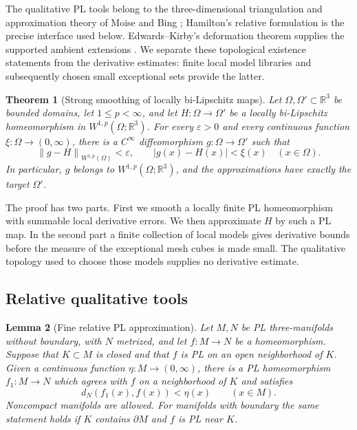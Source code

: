 \documentclass[11pt]{article}
\numberwithin{equation}{section}
\newtheorem{theorem}{Theorem}[section]
\newtheorem{lemma}[theorem]{Lemma}
\theoremstyle{definition}
\theoremstyle{remark}
\newcommand{\R}{\mathbb R}
\newcommand{\eps}{\varepsilon}
\newcommand{\norm}[1]{\left\lVert #1\right\rVert}
\begin{document}
The qualitative PL tools belong to the three-dimensional triangulation
and approximation theory of Moise and Bing
\cite{Moise1952Approximation,Moise1952Triangulation,Bing1959}; Hamilton's
relative formulation \cite{Hamilton1976} is the precise interface used
below. Edwards--Kirby's deformation theorem supplies the supported
ambient extensions \cite{EdwardsKirby1971}. We separate these
topological existence statements from the derivative estimates:
finite local model libraries and subsequently chosen small exceptional
sets provide the latter.

\begin{theorem}[Strong smoothing of locally bi-Lipschitz maps]
\label{sm:smoothing}
Let $\Omega,\Omega'\subset\R^3$ be bounded domains, let
$1\le p<\infty$, and let $H:\Omega\to\Omega'$ be a locally
bi-Lipschitz homeomorphism in $W^{1,p}(\Omega;\R^3)$.  For every
$\eps>0$ and every continuous function $\xi:\Omega\to(0,\infty)$,
there is a $C^\infty$ diffeomorphism $g:\Omega\to\Omega'$ such that
\begin{equation}
 \label{sm:smoothing-conclusion}
 \norm{g-H}_{W^{1,p}(\Omega)}<\eps,
 \qquad |g(x)-H(x)|<\xi(x)\quad(x\in\Omega).
\end{equation}
In particular, $g$ belongs to $W^{1,p}(\Omega;\R^3)$, and the
approximations have exactly the target $\Omega'$.
\end{theorem}

The proof has two parts.  First we smooth a locally finite PL
homeomorphism with summable local derivative errors.  We then approximate
$H$ by such a PL map.  In the second part a finite collection of local
models gives derivative bounds before the measure of the exceptional
mesh cubes is made small.  The qualitative topology used to choose those
models supplies no derivative estimate.

\subsection{Relative qualitative tools}

\begin{lemma}[Fine relative PL approximation]
\label{sm:relative-pl}
Let $M,N$ be PL three-manifolds without boundary, with $N$ metrized,
and let $f:M\to N$ be a homeomorphism.  Suppose that $K\subset M$ is
closed and that $f$ is PL on an open neighborhood of $K$.  Given a
continuous function $\eta:M\to(0,\infty)$, there is a PL
homeomorphism $f_1:M\to N$ which agrees with $f$ on a neighborhood of
$K$ and satisfies
\[
 d_N(f_1(x),f(x))<\eta(x)\qquad(x\in M).
\]
Noncompact manifolds are allowed.  For manifolds with boundary the same
statement holds if $K$ contains $\partial M$ and $f$ is PL near $K$.
\end{lemma}
\end{document}
